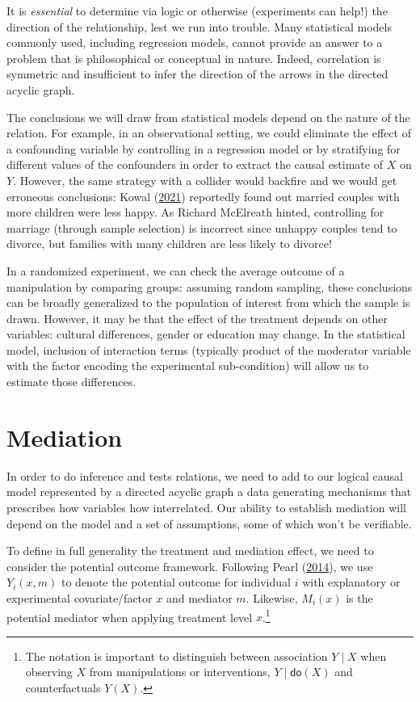 \documentclass[
  11pt,
  letterpaper,
]{scrbook}
\theoremstyle{definition}
\theoremstyle{remark}
\begin{document}
It is \emph{essential} to determine via logic or otherwise (experiments
can help!) the direction of the relationship, lest we run into trouble.
Many statistical models commonly used, including regression models,
cannot provide an answer to a problem that is philosophical or
conceptual in nature. Indeed, correlation is symmetric and insufficient
to infer the direction of the arrows in the directed acyclic graph.

The conclusions we will draw from statistical models depend on the
nature of the relation. For example, in an observational setting, we
could eliminate the effect of a confounding variable by controlling in a
regression model or by stratifying for different values of the
confounders in order to extract the causal estimate of \(X\) on \(Y\).
However, the same strategy with a collider would backfire and we would
get erroneous conclusions: Kowal
(\protect\hyperlink{ref-Kowal:2021}{2021}) reportedly found out married
couples with more children were less happy. As Richard McElreath hinted,
controlling for marriage (through sample selection) is incorrect since
unhappy couples tend to divorce, but families with many children are
less likely to divorce!

In a randomized experiment, we can check the average outcome of a
manipulation by comparing groups: assuming random sampling, these
conclusions can be broadly generalized to the population of interest
from which the sample is drawn. However, it may be that the effect of
the treatment depends on other variables: cultural differences, gender
or education may change. In the statistical model, inclusion of
interaction terms (typically product of the moderator variable with the
factor encoding the experimental sub-condition) will allow us to
estimate those differences.

\hypertarget{mediation}{%
\section{Mediation}\label{mediation}}

In order to do inference and tests relations, we need to add to our
logical causal model represented by a directed acyclic graph a data
generating mechanisms that prescribes how variables how interrelated.
Our ability to establish mediation will depend on the model and a set of
assumptions, some of which won't be verifiable.

To define in full generality the treatment and mediation effect, we need
to consider the potential outcome framework. Following Pearl
(\protect\hyperlink{ref-Pearl:2014}{2014}), we use \(Y_i(x, m)\) to
denote the potential outcome for individual \(i\) with explanatory or
experimental covariate/factor \(x\) and mediator \(m\). Likewise,
\(M_i(x)\) is the potential mediator when applying treatment level
\(x\).\footnote{The notation is important to distinguish between
  association \(Y \mid X\) when observing \(X\) from manipulations or
  interventions, \(Y \mid \mathsf{do}(X)\) and counterfactuals \(Y(X)\).}
\end{document}
